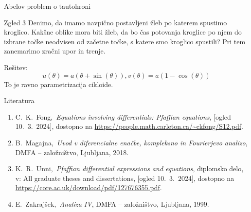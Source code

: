 \documentclass[t, 8pt]{beamer} %
\newcommand{\fillblack}[1]{
	\begin{tikzpicture}[remember picture, overlay]
		\node [shift={(0 cm,0cm)}]  at (current page.south west)
		{%
			\begin{tikzpicture}[remember picture, overlay] at (current page.south west)
				\draw [fill=black] (0, 0) -- (0,#1 \paperheight) --
				(\paperwidth,#1 \paperheight) -- (\paperwidth,0) -- cycle ;
			\end{tikzpicture}
		};
		\draw (current page.north west) rectangle (current page.south east);
	\end{tikzpicture}
}
\begin{document}
		\begin{frame}{Abelov problem o tautohroni}
			\begin{block}{Zgled 3}
					Denimo, da imamo navpično postavljeni žleb po katerem spustimo kroglico. Kakšne oblike mora biti žleb, da bo čas potovanja kroglice po njem do izbrane točke neodvisen od začetne točke, s katere smo kroglico spustili? Pri tem zanemarimo zračni upor in trenje.
					
					Rešitev: $$u(\theta)= a(\theta + \sin(\theta)), v(\theta) = a(1-\cos(\theta))$$ To je ravno parametrizacija cikloide.
			\end{block}
		\end{frame}
		
		\begin{frame}{Literatura}
			\begin{enumerate}
				\item C.~K.~Fong,~\emph{Equations involving differentials: Pfaffian equations}, [ogled 10.~3.~2024], dostopno na \url{https://people.math.carleton.ca/~ckfong/S12.pdf}.
				
				\item B.~Magajna,~\emph{Uvod v diferencialne enačbe, kompleksno in Fourierjevo analizo}, DMFA -- založništvo, Ljubljana, 2018.
				
				\item K.~R.~Unni,~\emph{Pfaffian differential expressions and equations}, diplomsko delo, v: All graduate theses and dissertations, [ogled 10.~3.~2024], dostopno na \url{https://core.ac.uk/download/pdf/127676355.pdf}.
				
				\item E.~Zakrajšek,~\emph{Analiza IV}, DMFA -- založništvo, Ljubljana, 1999.
			\end{enumerate}
		\end{frame}
		
	
\end{document}
